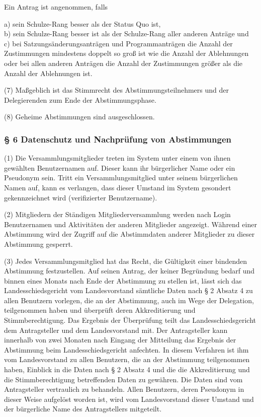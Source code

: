 Ein Antrag ist angenommen, falls

a) sein Schulze-Rang besser als der Status Quo ist,\\b) sein Schulze-Rang besser ist als der Schulze-Rang aller anderen Anträge und\\c) bei Satzungsänderungsanträgen und Programmanträgen die Anzahl der Zustimmungen mindestens doppelt so groß ist wie die Anzahl der Ablehnungen oder bei allen anderen Anträgen die Anzahl der Zustimmungen größer als die Anzahl der Ablehnungen ist.

(7) Maßgeblich ist das Stimmrecht des Abstimmungsteilnehmers und der Delegierenden zum Ende der Abstimmungsphase.

(8) Geheime Abstimmungen sind ausgeschlossen.

\subsubsection{§ 6 Datenschutz und Nachprüfung von Abstimmungen}

(1) Die Versammlungsmitglieder treten im System unter einem von ihnen gewählten Benutzernamen auf. Dieser kann ihr bürgerlicher Name oder ein Pseudonym sein. Tritt ein Versammlungsmitglied unter seinem bürgerlichen Namen auf, kann es verlangen, dass dieser Umstand im System gesondert gekennzeichnet wird (verifizierter Benutzername).

(2) Mitgliedern der Ständigen Mitgliederversammlung werden nach Login Benutzernamen und Aktivitäten der anderen Mitglieder angezeigt. Während einer Abstimmung wird der Zugriff auf die Abstimmdaten anderer Mitglieder zu dieser Abstimmung gesperrt.

(3) Jedes Versammlungsmitglied hat das Recht, die Gültigkeit einer bindenden Abstimmung festzustellen. Auf seinen Antrag, der keiner Begründung bedarf und binnen eines Monats nach Ende der Abstimmung zu stellen ist, lässt sich das Landesschiedsgericht vom Landesvorstand sämtliche Daten nach § 2 Absatz 4 zu allen Benutzern vorlegen, die an der Abstimmung, auch im Wege der Delegation, teilgenommen haben und überprüft deren Akkreditierung und Stimmberechtigung. Das Ergebnis der Überprüfung teilt das Landesschiedsgericht dem Antragsteller und dem Landesvorstand mit. Der Antragsteller kann innerhalb von zwei Monaten nach Eingang der Mitteilung das Ergebnis der Abstimmung beim Landesschiedsgericht anfechten. In diesem Verfahren ist ihm vom Landesvorstand zu allen Benutzern, die an der Abstimmung teilgenommen haben, Einblick in die Daten nach § 2 Absatz 4 und die die Akkreditierung und die Stimmberechtigung betreffenden Daten zu gewähren. Die Daten sind vom Antragsteller vertraulich zu behandeln. Allen Benutzern, deren Pseudonym in dieser Weise aufgelöst worden ist, wird vom Landesvorstand dieser Umstand und der bürgerliche Name des Antragstellers mitgeteilt.

